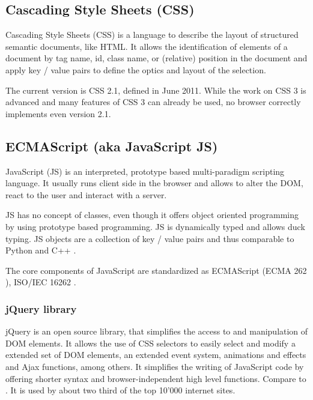 \subsection{Cascading Style Sheets (CSS)}
\label{sec:css}

Cascading Style Sheets (CSS) is a language to describe the layout of structured semantic documents, like HTML.
It allows the identification of elements of a document by tag name, id, class name, or (relative) position in the document and apply key / value pairs to define the optics and layout of the selection.


The current version is CSS 2.1\cite{css_spec}, defined in June 2011. While the work on CSS 3 is advanced\cite{css_stat} and many features of CSS 3 can already be used\cite{caniuse_css}, no browser correctly implements even version 2.1.


\subsection{ECMAScript (aka JavaScript JS)}
\label{sec:js}
JavaScript (JS) is an interpreted, prototype based multi-paradigm scripting language.
It usually runs client side in the browser and allows to alter the DOM, react to the user and interact with a server.

JS has no concept of classes, even though it offers object oriented programming by using prototype based programming.
JS is dynamically typed and allows duck typing.
JS objects are a collection of key / value pairs and thus comparable to Python  and C++ .


The core components of JavaScript are standardized as ECMAScript (ECMA 262 \cite{js_std}), ISO/IEC 16262 \cite{js_iso}.


\subsubsection{jQuery library}
\label{sec:jquery}
jQuery is an open source library, that simplifies the access to and manipulation of DOM elements.
It allows the use of CSS selectors to easily select and modify a extended set of DOM elements, an extended event system, animations and effects and Ajax functions, among others.
It simplifies the writing of JavaScript code by offering shorter syntax and browser-independent high level functions.
Compare  to .
It is used by about two third of the top 10'000 internet sites\cite{jquery_usage}.

